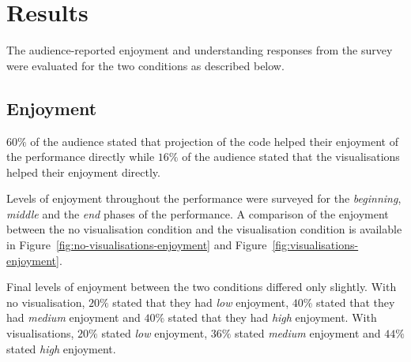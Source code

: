 \section{Results}

The audience-reported enjoyment and understanding responses from the survey were evaluated for the two conditions as described below.

\subsection{Enjoyment}

$60\%$ of the audience stated that projection of the code helped their enjoyment of the performance directly while $16\%$ of the audience stated that the visualisations helped their enjoyment directly.

Levels of enjoyment throughout the performance were surveyed for the \emph{beginning}, \emph{middle} and the \emph{end} phases of the performance. A comparison of the enjoyment between the no visualisation condition and the visualisation condition is available in Figure~\ref{fig:no-visualisations-enjoyment} and Figure~\ref{fig:visualisations-enjoyment}.

Final levels of enjoyment between the two conditions differed only slightly. With no visualisation, $20\%$ stated that they had \emph{low} enjoyment, $40\%$ stated that they had \emph{medium} enjoyment and $40\%$ stated that they had \emph{high} enjoyment. With visualisations, $20\%$ stated \emph{low} enjoyment, $36\%$ stated \emph{medium} enjoyment and $44\%$ stated \emph{high} enjoyment.

